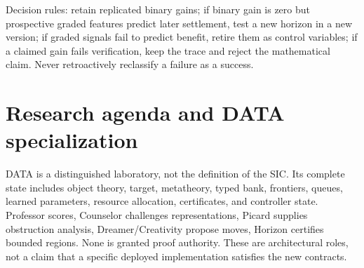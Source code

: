 \documentclass[11pt]{article}
\theoremstyle{definition}\newtheorem{definition}[theorem]{Definition}\newtheorem{example}[theorem]{Example}\newtheorem{conjecture}[theorem]{Conjecture}
\begin{document}
Decision rules: retain replicated binary gains; if binary gain is zero but prospective graded features predict later settlement, test a new horizon in a new version; if graded signals fail to predict benefit, retire them as control variables; if a claimed gain fails verification, keep the trace and reject the mathematical claim. Never retroactively reclassify a failure as a success.
\section{Research agenda and DATA specialization}
DATA is a distinguished laboratory, not the definition of the SIC. Its complete state includes object theory, target, metatheory, typed bank, frontiers, queues, learned parameters, resource allocation, certificates, and controller state. Professor scores, Counselor challenges representations, Picard supplies obstruction analysis, Dreamer/Creativity propose moves, Horizon certifies bounded regions. None is granted proof authority. These are architectural roles, not a claim that a specific deployed implementation satisfies the new contracts.
\end{document}
